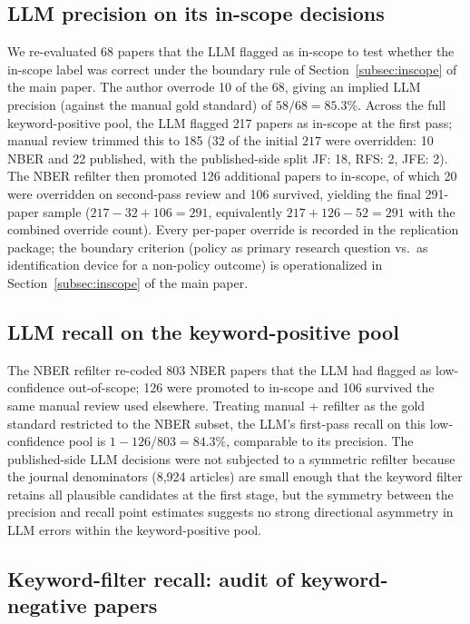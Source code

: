 \documentclass[12pt]{article}
\begin{document}
\subsection*{LLM precision on its in-scope decisions}

We re-evaluated 68 papers that the LLM flagged as in-scope to test whether
the in-scope label was correct under the boundary rule of
Section~\ref{subsec:inscope} of the main paper.  The author overrode 10 of the 68, giving an
implied LLM precision (against the manual gold standard) of
$58/68 = 85.3\%$.  Across the full keyword-positive pool, the LLM flagged
217 papers as in-scope at the first pass; manual review trimmed this to
185 ($32$ of the initial $217$ were overridden: 10 NBER and 22 published,
with the published-side split JF: 18, RFS: 2, JFE: 2).  The NBER refilter
then promoted 126 additional papers to in-scope, of which 20 were overridden
on second-pass review and 106 survived, yielding the final 291-paper sample
($217 - 32 + 106 = 291$, equivalently $217 + 126 - 52 = 291$ with the
combined override count).  Every per-paper override is recorded in the
replication package; the boundary criterion (policy as primary research
question vs.\ as identification device for a non-policy outcome) is
operationalized in Section~\ref{subsec:inscope} of the main paper.

\subsection*{LLM recall on the keyword-positive pool}

The NBER refilter re-coded 803 NBER papers that the LLM had flagged as
low-confidence out-of-scope; 126 were promoted to in-scope and 106
survived the same manual review used elsewhere.  Treating
manual + refilter as the gold standard restricted to the
NBER subset, the LLM's first-pass recall on this low-confidence pool is
$1 - 126/803 = 84.3\%$, comparable to its precision.  The published-side
LLM decisions were not subjected to a symmetric refilter because the
journal denominators (8,924 articles) are small enough that the keyword
filter retains all plausible candidates at the first stage, but the
symmetry between the precision and recall point estimates suggests no
strong directional asymmetry in LLM errors within the keyword-positive
pool.

\subsection*{Keyword-filter recall: audit of keyword-negative papers}
\end{document}
